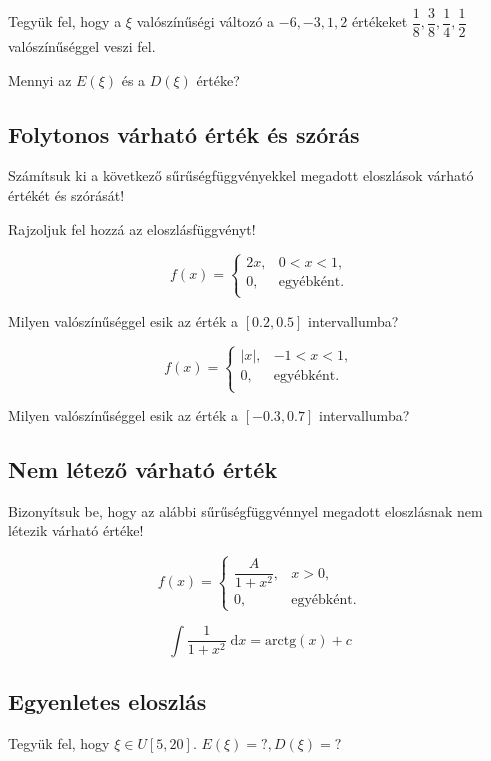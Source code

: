 \documentclass[a4paper]{article}
\begin{document}
Tegyük fel, hogy a $\xi$ valószínűségi változó a $-6, -3, 1, 2$ értékeket $\dfrac{1}{8}, \dfrac{3}{8}, \dfrac{1}{4}, \dfrac{1}{2}$ valószínűséggel veszi fel.

Mennyi az $E(\xi)$ és a $D(\xi)$ értéke?

\subsection{Folytonos várható érték és szórás}

Számítsuk ki a következő sűrűségfüggvényekkel megadott eloszlások várható értékét és szórását!

Rajzoljuk fel hozzá az eloszlásfüggvényt!

\[
f(x) = \begin{cases}
2x, & 0 < x < 1, \\
0, & \text{egyébként}. \\
\end{cases}
\]

Milyen valószínűséggel esik az érték a $[0.2, 0.5]$ intervallumba?

\[
f(x) = \begin{cases}
|x|, & -1 < x < 1, \\
0, & \text{egyébként}. \\
\end{cases}
\]

Milyen valószínűséggel esik az érték a $[-0.3, 0.7]$ intervallumba?

\subsection{Nem létező várható érték}

Bizonyítsuk be, hogy az alábbi sűrűségfüggvénnyel megadott eloszlásnak nem létezik várható értéke!

\[
f(x) = \begin{cases}
\dfrac{A}{1 + x^2}, & x > 0, \\
0, & \text{egyébként}.
\end{cases}
\]

\[
\displaystyle \int \! \dfrac{1}{1 + x^2} \; \mathrm{d}x = \text{arctg}(x) + c
\]

\subsection{Egyenletes eloszlás}

Tegyük fel, hogy $\xi \in U[5, 20]$.
$E(\xi) = ?, D(\xi) = ?$
\end{document}
